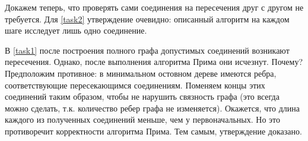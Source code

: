 Докажем теперь, что проверять сами соединения на пересечения друг с другом не требуется. Для \ref{task2} утверждение очевидно: описанный алгоритм на каждом шаге исследует лишь одно соединение.

В \ref{task1} после построения полного графа допустимых соединений возникают пересечения. Однако, после выполнения алгоритма Прима они исчезнут. Почему? Предположим противное: в минимальном остовном дереве имеются ребра, соответствующие пересекающимся соединениям. Поменяем концы этих соединений таким образом, чтобы не нарушить связность графа (это всегда можно сделать, т.к. количество ребер графа не изменяется). Окажется, что длина каждого из полученных соединений меньше, чем у первоначальных. Но это противоречит корректности алгоритма Прима. Тем самым, утверждение доказано.